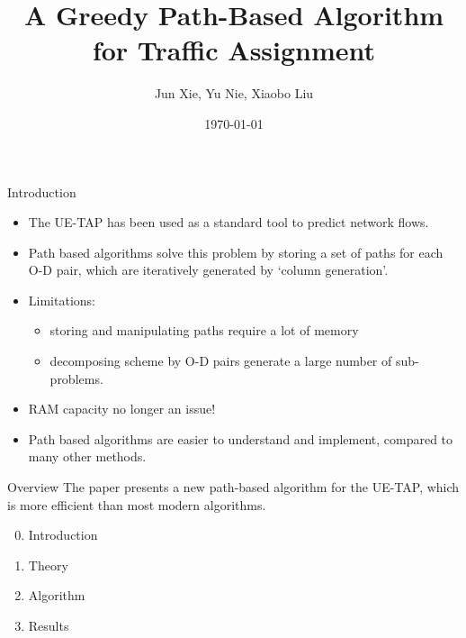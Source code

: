 \documentclass{beamer}
\title{A Greedy Path-Based Algorithm for Traffic Assignment}
\author{Jun Xie, Yu Nie, Xiaobo Liu}
\date{\today}
\begin{document}
\begin{frame}
    \titlepage
\end{frame}

\begin{frame}{Introduction}
\begin{itemize}
    \item The UE-TAP has been used as a standard tool to
    predict network flows.

    \item Path based algorithms solve this problem by storing
    a set of paths for each O-D pair, which are iteratively
    generated by `column generation'.

    \item Limitations: 
    \begin{itemize}
    \item storing and manipulating paths
    require a lot of memory
    \item decomposing scheme by O-D pairs
    generate a large number of sub-problems.
    \end{itemize}

\pause

    \item RAM capacity no longer an issue!

    \item Path based algorithms are easier to understand and
    implement, compared to many other methods.
\end{itemize}
\end{frame}

\begin{frame}{Overview}
The paper presents a new path-based algorithm for the
UE-TAP, which is more efficient than most modern algorithms.

\pause

\begin{enumerate}
\setcounter{enumi}{-1}
    \item Introduction
    \item Theory
    \item Algorithm
    \item Results
\end{enumerate}
\end{frame}
\end{document}
